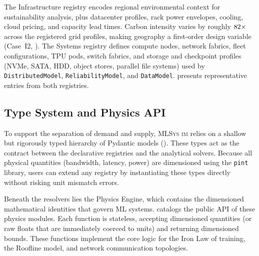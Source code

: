 \documentclass[10pt,twocolumn]{article}
\newcommand{\mlsysim}{\mbox{\textsc{MLSys}\,\textperiodcentered\,\textsc{im}}\xspace}
\begin{document}
\begin{appendices}
The Infrastructure registry encodes regional environmental context for sustainability analysis, plus datacenter profiles, rack power envelopes, cooling, cloud pricing, and capacity lead times. Carbon intensity varies by roughly $82{\times}$ across the \CountGridProfiles{} registered grid profiles, making geography a first-order design variable (Case~I2, ). The Systems registry defines compute nodes, network fabrics, fleet configurations, TPU pods, switch fabrics, and storage and checkpoint profiles (NVMe, SATA, HDD, object stores, parallel file systems) used by \texttt{DistributedModel}, \texttt{ReliabilityModel}, and \texttt{DataModel}.  presents representative entries from both registries.

\subsection{Type System and Physics API}

To support the separation of demand and supply, \mlsysim relies on a shallow but rigorously typed hierarchy of Pydantic models (). These types act as the contract between the declarative registries and the analytical solvers. Because all physical quantities (bandwidth, latency, power) are dimensioned using the \texttt{pint} library, users can extend any registry by instantiating these types directly without risking unit mismatch errors.

Beneath the resolvers lies the Physics Engine, which contains the dimensioned mathematical identities that govern ML systems.  catalogs the public API of these physics modules. Each function is stateless, accepting dimensioned quantities (or raw floats that are immediately coerced to units) and returning dimensioned bounds. These functions implement the core logic for the Iron Law of training, the Roofline model, and network communication topologies.


\end{appendices}
\end{document}
